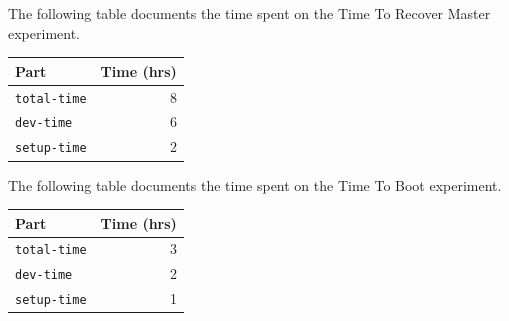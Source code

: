 \documentclass{acm_proc_article-sp}
\begin{document}
The following table documents the time spent on the Time To Recover Master experiment.

\begin{tabular}{ | l | r | }
	\hline
	Part & Time (hrs) \\ \hline \hline
	\texttt{total-time} & 8\\ \hline
	\texttt{dev-time} & 6\\ \hline
	\texttt{setup-time} & 2\\ \hline
\end{tabular}

The following table documents the time spent on the Time To Boot experiment.

\begin{tabular}{ | l | r | }
	\hline
	Part & Time (hrs) \\ \hline \hline
	\texttt{total-time} & 3\\ \hline
	\texttt{dev-time} & 2\\ \hline
	\texttt{setup-time} & 1\\ \hline
\end{tabular}
\end{document}

